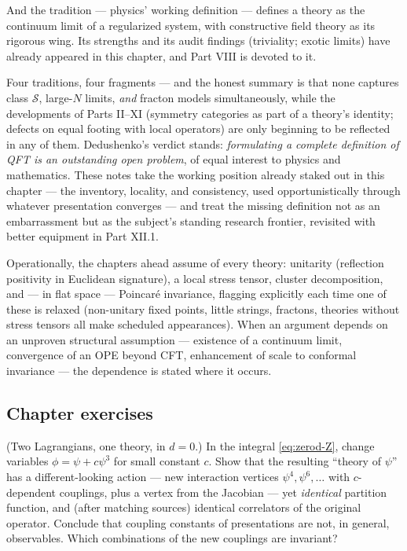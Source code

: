 And the  tradition --- physics' working definition --- defines a
theory as the continuum limit of a regularized system, with constructive field
theory as its rigorous wing. Its strengths and its audit findings (triviality;
exotic limits) have already appeared in this chapter, and Part VIII is devoted
to it.

\medskip

\noin Four traditions, four fragments --- and the honest summary is that none
captures class $\mathcal{S}$, large-$N$ limits, \emph{and} fracton models
simultaneously, while the developments of Parts II--XI (symmetry
categories as part of a theory's identity; defects on equal footing with
local operators) are only beginning to be reflected in any of them.
Dedushenko's verdict stands: \emph{formulating a complete definition of
QFT is an outstanding open problem}, of equal interest to physics and
mathematics. These notes take the working position already staked out in
this chapter --- the inventory, locality, and consistency, used
opportunistically through whatever presentation converges --- and treat
the missing definition not as an embarrassment but as the subject's
standing research frontier, revisited with better equipment in Part XII.1.

\begin{nnote}
Operationally, the chapters ahead assume of every theory: unitarity (reflection
positivity in Euclidean signature), a local stress tensor, cluster
decomposition, and --- in flat space --- Poincar\'e invariance, flagging
explicitly each time one of these is relaxed (non-unitary fixed points, little
strings, fractons, theories without stress tensors all make scheduled
appearances). When an argument depends on an unproven structural assumption ---
existence of a continuum limit, convergence of an OPE beyond CFT, enhancement of
scale to conformal invariance --- the dependence is stated where it occurs.
\end{nnote}

\subsection*{Chapter exercises}

\begin{exercise}[classic]
\label{exr:field-redef}
(Two Lagrangians, one theory, in $d=0$.) In the integral \eqref{eq:zerod-Z},
change variables $\phi = \psi + c\psi^3$ for small constant $c$. Show that the
resulting ``theory of $\psi$'' has a different-looking action --- new
interaction vertices $\psi^4, \psi^6, \dots$ with $c$-dependent couplings, plus
a vertex from the Jacobian --- yet \emph{identical} partition function, and
(after matching sources) identical correlators of the original operator.
Conclude that coupling constants of presentations are not, in general,
observables. Which combinations of the new couplings are invariant?
\end{exercise}

